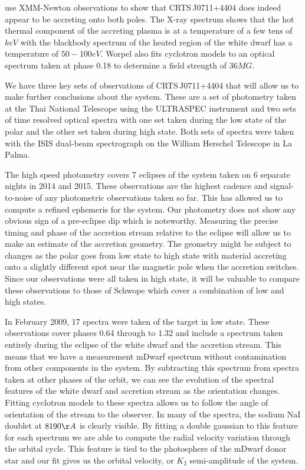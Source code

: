 \documentclass[a4paper,fleqn,usenatbib]{mnras}
\begin{document}
\citet{Worpel2015} use XMM-Newton observations to show that CRTS\,J0711+4404 does indeed appear to be accreting onto both poles. The X-ray spectrum shows that the hot thermal component of the accreting plasma is at a temperature of a few tens of $keV$ with the blackbody spectrum of the heated region of the white dwarf has a temperature of $50-100 eV$. Worpel also fits cyclotron models to an optical spectrum taken at phase 0.18 to determine a field strength of $36MG$. 

We have three key sets of observations of CRTS\,J0711+4404 that will allow us to make further conclusions about the system. These are a set of photometry taken at the Thai National Telescope using the ULTRASPEC instrument and two sets of time resolved optical spectra with one set taken during the low state of the polar and the other set taken during high state. Both sets of spectra were taken with the ISIS dual-beam spectrograph on the William Herschel Telescope in La Palma.

The high speed photometry covers 7 eclipses of the system taken on 6 separate nights in 2014 and 2015. These observations are the highest cadence and signal-to-noise of any photometric observations taken so far. This has allowed us to compute a refined ephemeris for the system. Our photometry does not show any obvious sign of a pre-eclipse dip which is noteworthy. Measuring the precise timing and phase of the accretion stream relative to the eclipse will allow us to make an estimate of the accretion geometry. The geometry might be subject to changes as the polar goes from low state to high state with material accreting onto a slightly different spot near the magnetic pole when the accretion switches. Since our observations were all taken in high state, it will be valuable to compare these observations to those of Schwope which cover a combination of low and high states. 

In February 2009, 17 spectra were taken of the target in low state. These observations cover phases 0.64 through to 1.32 and include a spectrum taken entirely during the eclipse of the white dwarf and the accretion stream. This means that we have a measurement mDwarf spectrum without contamination from other components in the system. By subtracting this spectrum from spectra taken at other phases of the orbit, we can see the evolution of the spectral features of the white dwarf and accretion stream as the orientation changes. Fitting cyclotron models to these spectra allows us to follow the angle of orientation of the stream to the observer. In many of the spectra, the sodium NaI doublet at $8190 \AA$ is clearly visible. By fitting a double gaussian to this feature for each spectrum we are able to compute the radial velocity variation through the orbital cycle. This feature is tied to the photosphere of the mDwarf donor star and our fit gives us the orbital velocity, or $K_2$ semi-amplitude of the system. 
\end{document}
